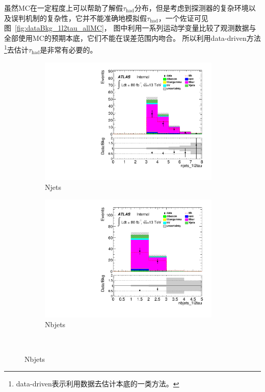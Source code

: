 虽然MC在一定程度上可以帮助了解假$\tau_{\text{had}}$分布，但是考虑到探测器的复杂环境以及误判机制的复杂性，它并不能准确地模拟假$\tau_{\text{had}}$，一个佐证可见图~\ref{fig:dataBkg_1l2tau_allMC}，
图中利用一系列运动学变量比较了观测数据与全部使用MC的预期本底，它们不能在误差范围内吻合。
所以利用data-driven方法\footnote{data-driven表示利用数据去估计本底的一类方法。}去估计$\tau_{\text{had}}$是非常有必要的。
\begin{figure}[htp]
\centering
\begin{subfigure}[b]{0.45\textwidth}
 \includegraphics[width=0.95\textwidth,angle=-90]{fig/OneL2taulowBDTOS/njets_1l2tau_F.pdf}
 \caption{Njets}
\end{subfigure}
\begin{subfigure}[b]{0.45\textwidth}
 \includegraphics[width=0.95\textwidth,angle=-90]{fig/OneL2taulowBDTOS/nbjets_1l2tau_F.pdf}
 \caption{Nbjets}
\end{subfigure}\\

\end{figure}
